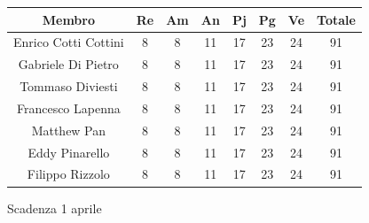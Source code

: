 \documentclass{article}
\begin{document}
\begin{table}[!h]
	\begin{center}
		\begin{tabular}{ |c|c|c|c|c|c|c|c| }
			\hline
			\textbf{Membro}    & \textbf{Re} & \textbf{Am} & \textbf{An} & \textbf{Pj} & \textbf{Pg} & \textbf{Ve} & \textbf{Totale} \\
			\hline
			Enrico Cotti Cottini     & 8           & 8           & 11          & 17          & 23          & 24          & 91              \\
			Gabriele Di Pietro       & 8           & 8           & 11          & 17          & 23          & 24          & 91              \\
			Tommaso Diviesti         & 8           & 8           & 11          & 17          & 23          & 24          & 91              \\
			Francesco Lapenna        & 8           & 8           & 11          & 17          & 23          & 24          & 91              \\
			Matthew Pan              & 8           & 8           & 11          & 17          & 23          & 24          & 91              \\
			Eddy Pinarello           & 8           & 8           & 11          & 17          & 23          & 24          & 91              \\
			Filippo Rizzolo          & 8           & 8           & 11          & 17          & 23          & 24          & 91              \\
			\hline
		\end{tabular}
	\end{center}
\end{table}

Scadenza 
1 aprile
\end{document}
